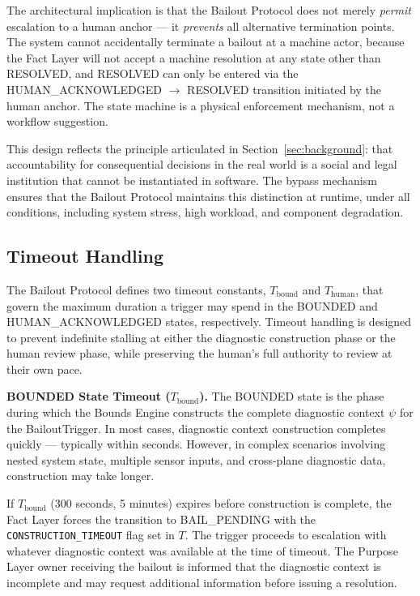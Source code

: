 The architectural implication is that the Bailout Protocol does not merely \textit{permit} escalation to a human anchor --- it \textit{prevents} all alternative termination points. The system cannot accidentally terminate a bailout at a machine actor, because the Fact Layer will not accept a machine resolution at any state other than RESOLVED, and RESOLVED can only be entered via the HUMAN\_ACKNOWLEDGED $\rightarrow$ RESOLVED transition initiated by the human anchor. The state machine is a physical enforcement mechanism, not a workflow suggestion.

This design reflects the principle articulated in Section~\ref{sec:background}: that accountability for consequential decisions in the real world is a social and legal institution that cannot be instantiated in software. The bypass mechanism ensures that the Bailout Protocol maintains this distinction at runtime, under all conditions, including system stress, high workload, and component degradation.

\subsection{Timeout Handling}
\label{sec:timeout-handling}

The Bailout Protocol defines two timeout constants, $T_{\text{bound}}$ and $T_{\text{human}}$, that govern the maximum duration a trigger may spend in the BOUNDED and HUMAN\_ACKNOWLEDGED states, respectively. Timeout handling is designed to prevent indefinite stalling at either the diagnostic construction phase or the human review phase, while preserving the human's full authority to review at their own pace.

\bigskip

\noindent\textbf{BOUNDED State Timeout ($T_{\text{bound}}$).} The BOUNDED state is the phase during which the Bounds Engine constructs the complete diagnostic context $\psi$ for the BailoutTrigger. In most cases, diagnostic context construction completes quickly --- typically within seconds. However, in complex scenarios involving nested system state, multiple sensor inputs, and cross-plane diagnostic data, construction may take longer.

If $T_{\text{bound}}$ (300 seconds, 5 minutes) expires before construction is complete, the Fact Layer forces the transition to BAIL\_PENDING with the \texttt{CONSTRUCTION\_TIMEOUT} flag set in $T$. The trigger proceeds to escalation with whatever diagnostic context was available at the time of timeout. The Purpose Layer owner receiving the bailout is informed that the diagnostic context is incomplete and may request additional information before issuing a resolution.

